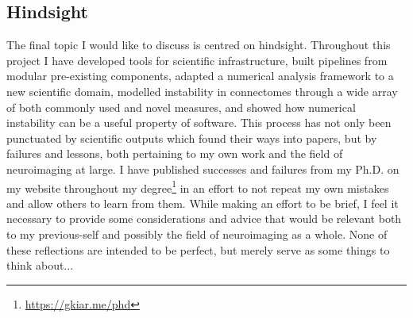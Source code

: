 \subsection{Hindsight}
The final topic I would like to discuss is centred on hindsight. Throughout this project I have developed tools
for scientific infrastructure, built pipelines from modular pre-existing components, adapted a numerical analysis
framework to a new scientific domain, modelled instability in connectomes through a wide array of both commonly
used and novel measures, and showed how numerical instability can be a useful property of software. This process
has not only been punctuated by scientific outputs which found their ways into papers, but by failures and lessons,
both pertaining to my own work and the field of neuroimaging at large. I have published successes and failures from
my Ph.D. on my website throughout my degree\footnote{\url{https://gkiar.me/phd}} in an effort to not repeat my own
mistakes and allow others to learn from them. While making an effort to be brief, I feel it necessary to provide
some considerations and advice that would be relevant both to my previous-self and possibly the field of
neuroimaging as a whole. None of these reflections are intended to be perfect, but merely serve as some things to
think about...


